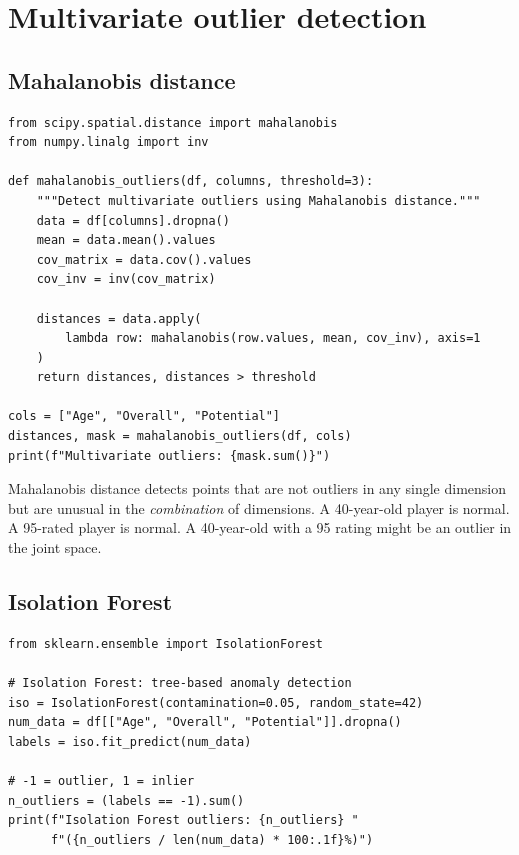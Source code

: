 \section{Multivariate outlier detection}

\subsection{Mahalanobis distance}

\begin{verbatim}
from scipy.spatial.distance import mahalanobis
from numpy.linalg import inv

def mahalanobis_outliers(df, columns, threshold=3):
    """Detect multivariate outliers using Mahalanobis distance."""
    data = df[columns].dropna()
    mean = data.mean().values
    cov_matrix = data.cov().values
    cov_inv = inv(cov_matrix)

    distances = data.apply(
        lambda row: mahalanobis(row.values, mean, cov_inv), axis=1
    )
    return distances, distances > threshold

cols = ["Age", "Overall", "Potential"]
distances, mask = mahalanobis_outliers(df, cols)
print(f"Multivariate outliers: {mask.sum()}")
\end{verbatim}

\begin{preprocesstip}
Mahalanobis distance detects points that are not outliers in any single dimension but are unusual in the \emph{combination} of dimensions. A 40-year-old player is normal. A 95-rated player is normal. A 40-year-old with a 95 rating might be an outlier in the joint space.
\end{preprocesstip}

\subsection{Isolation Forest}

\begin{verbatim}
from sklearn.ensemble import IsolationForest

# Isolation Forest: tree-based anomaly detection
iso = IsolationForest(contamination=0.05, random_state=42)
num_data = df[["Age", "Overall", "Potential"]].dropna()
labels = iso.fit_predict(num_data)

# -1 = outlier, 1 = inlier
n_outliers = (labels == -1).sum()
print(f"Isolation Forest outliers: {n_outliers} "
      f"({n_outliers / len(num_data) * 100:.1f}%)")
\end{verbatim}

